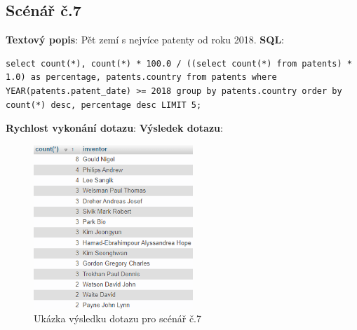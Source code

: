 \subsection{Scénář č.7}
\textbf{Textový popis}: Pět zemí s nejvíce patenty od roku 2018.
\newline
\textbf{SQL}: 
\begin{lstlisting}[label = {lst:elements_a}]
select count(*), count(*) * 100.0 / ((select count(*) from patents) * 1.0) as percentage, patents.country from patents where YEAR(patents.patent_date) >= 2018 group by patents.country order by count(*) desc, percentage desc LIMIT 5;
\end{lstlisting}
\textbf{Rychlost vykonání dotazu}: 
\newline
\textbf{Výsledek dotazu}:
\begin{figure}[H]
\centering
\includegraphics[width=6cm]{img/scenare/scenar_9}
\caption{Ukázka výsledku dotazu pro scénář č.7}
\label{fig:scenar7}
\end{figure}

